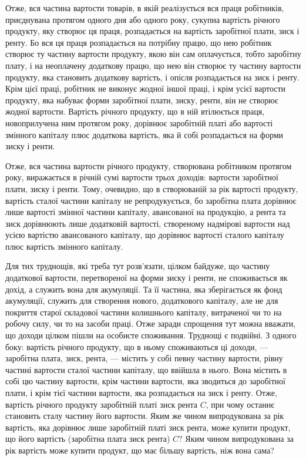 
Отже, вся частина вартости товарів, в якій реалізується вся праця робітників,
приєднувана протягом одного дня або одного року, сукупна вартість річного
продукту, яку створює ця праця, розпадається на вартість заробітної плати,
зиск і ренту. Бо вся ця праця розпадається на потрібну працю, що нею робітник
створює ту частину вартости продукту, якою він сам оплачується, тобто заробітну
плату, і на неоплачену додаткову працю, що нею він створює ту частину
вартости продукту, яка становить додаткову вартість, і опісля розпадається на
зиск і ренту. Крім цієї праці, робітник не виконує жодної іншої праці, і крім
усієї вартости продукту, яка набуває форми заробітної плати, зиску, ренти, він
не створює жодної вартости. Вартість річного продукту, що в ній втілюється праця,
новоприлучена ним протягом року, дорівнює заробітній платі або вартості змінного
капіталу плюс додаткова вартість, яка й собі розпадається на форми зиску
і ренти.

Отже, вся частина вартости річного продукту, створювана робітником протягом
року, виражається в річній сумі вартости трьох доходів: вартости заробітної
плати, зиску і ренти. Тому, очевидно, що в створюваній за рік вартості
продукту, вартість сталої частини капіталу не репродукується, бо заробітна
плата дорівнює лише вартості змінної частини капіталу, авансованої на продукцію,
а рента та зиск дорівнюють лише додатковій вартості, створеному надмірові
вартости над усією вартістю авансованого капіталу, що дорівнює вартості
сталого капіталу плюс вартість змінного капіталу.

Для тих труднощів, які треба тут розв’язати, цілком байдуже, що частину
додаткової вартости, перетвореної на форми зиску і ренти, не споживається як
дохід, а служить вона для акумуляції. Та її частина, яка зберігається як фонд акумуляції, служить
для створення нового, додаткового капіталу, але не для покриття
старої складової частини колишнього капіталу, витраченої чи то на
робочу силу, чи то на засоби праці. Отже заради спрощення тут можна вважати,
що доходи цілком пішли на особисте споживання. Труднощі є подвійні.
З одного боку: вартість річного продукту, що в ньому споживаються ці
доходи, — заробітна плата, зиск, рента, — містить у собі певну частину вартости,
рівну частині вартости сталої частини капіталу, що ввійшла в нього. Вона містить
в собі цю частину вартости, крім частини вартости, яка зводиться до заробітної
плати, і крім тієї частини вартости, яка розпадається на зиск і ренту. Отже,
вартість річного продукту \deq{} заробітній платі \dplus{} зиск \dplus{} рента \dplus{} $C$, при чому
останнє становить сталу частину його вартости. Яким же чином випродукована
за рік вартість, яка дорівнює лише заробітній платі \dplus{} зиск \dplus{} рента, може
купити продукт, що його вартість \deq{} (заробітна плата \dplus{} зиск \dplus{} рента) \dplus{} $C$?
Яким чином випродукована за рік вартість може купити продукт, що має
більшу вартість, ніж вона сама?

